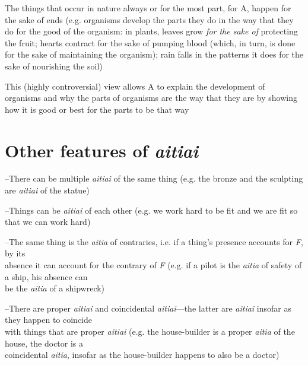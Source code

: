 \documentclass[11pt]{article}
\begin{document}
\noindent The things that occur in nature always or for the most part, for A, happen for the sake of ends (e.g. organisms develop the parts they do in the way that they do for the good of the organism: in plants, leaves grow \emph{for the sake of} protecting the fruit; hearts contract for the sake of pumping blood (which, in turn, is done for the sake of maintaining the organism); rain falls in the patterns it does for the sake of nourishing the soil)
\vspace*{1mm}

\noindent This (highly controversial) view allows A to explain the development of organisms and why the parts of organisms are the way that they are by showing how it is good or best for the parts to be that way

\section*{Other features of \emph{aitiai}}
\vspace*{1mm}

--There can be multiple \emph{aitiai} of the same thing (e.g. the bronze and the sculpting are \emph{aitiai} of the statue)
\vspace*{1mm}

--Things can be \emph{aitiai} of each other (e.g. we work hard to be fit and we are fit so that we can work hard)
\vspace*{1mm}

--The same thing is the \emph{aitia} of contraries, i.e. if a thing's presence accounts for \emph{F}, by its\\\hspace*{6mm}absence it can account for the contrary of \emph{F} (e.g. if a pilot is the \emph{aitia} of safety of a ship, his absence can\\\hspace*{6mm}be the \emph{aitia} of a shipwreck)
\vspace*{1mm}

--There are proper \emph{aitiai} and coincidental \emph{aitiai}---the latter are \emph{aitiai} insofar as they happen to coincide\\\hspace*{6mm}with things that are proper \emph{aitiai} (e.g. the house-builder is a proper \emph{aitia} of the house, the doctor is a\\\hspace*{6mm}coincidental \emph{aitia}, insofar as the house-builder happens to also be a doctor)
\vspace*{1mm}
\end{document}
